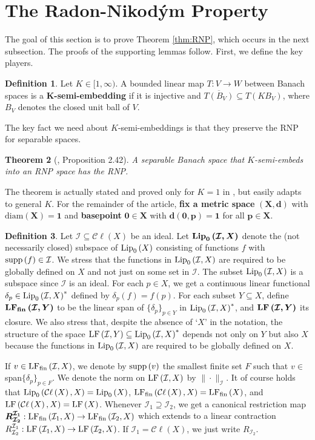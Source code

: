 \documentclass[12pt]{amsart}
\newtheorem{theorem}{Theorem}[section]
\theoremstyle{definition}
\newtheorem{definition}[theorem]{Definition}
\numberwithin{equation}{section}
\def \I {\mathcal{I}}
\def \sbs {\subseteq}
\def \sps {\supseteq}
\def \closure {\overline}
\newcommand{\Cl}[1]{\mathcal{C}\ell\left(#1\right)}
\newcommand{\diam}[1]{\mathrm{diam}\left( #1 \right)}
\begin{document}
\section{The Radon-Nikod\'ym Property} \label{sec:RNP}
The goal of this section is to prove Theorem \ref{thm:RNP}, which occurs in the next subsection. The proofs of the supporting lemmas follow. First, we define the key players.

\begin{definition}
Let $K \in [1,\infty)$. A bounded linear map $T: V \to W$ between Banach spaces is a $\boldsymbol{K}$\textbf{-semi-embedding} if it is injective and $\closure{T(B_V)} \sbs T(KB_V)$, where $B_V$ denotes the closed unit ball of $V$.
\end{definition}

The key fact we need about $K$-semi-embeddings is that they preserve the RNP for separable spaces.

\begin{theorem}[\cite{P}, Proposition 2.42] \label{thm:semiembeddingRNP}
A separable Banach space that $K$-semi-embeds into an RNP space has the RNP.
\end{theorem}

The theorem is actually stated and proved only for $K=1$ in \cite{P}, but easily adapts to general $K$. For the remainder of the article, \textbf{fix a metric space} $\boldsymbol{(X,d)}$ with $\boldsymbol{\diam{X} = 1}$ and \textbf{basepoint} $\boldsymbol{0 \in X}$ with $\boldsymbol{d(0,p) = 1}$ for all $\boldsymbol{p \in X}$.

\begin{definition}
Let $\I \sbs \Cl{X}$ be an ideal. Let $\boldsymbol{\Lip{\I,X}}$ denote the (not necessarily closed) subspace of $\Lip{X}$ consisting of functions $f$ with $\supp{f} \in \I$. We stress that the functions in $\Lip{\I,X}$ are required to be globally defined on $X$ and not just on some set in $\I$. The subset $\Lip{\I,X}$ is a subspace since $\I$ is an ideal. For each $p \in X$, we get a continuous linear functional $\delta_p \in \Lip{\I,X}^*$ defined by $\delta_p(f) = f(p)$. For each subset $Y \sbs X$, define $\boldsymbol{\LFf{\I}{Y}}$ to be the linear span of $\{\delta_p\}_{p \in Y}$ in $\Lip{\I,X}^*$, and $\boldsymbol{\LF{\I}{Y}}$ its closure. We also stress that, despite the absence of `$X$' in the notation, the structure of the space $\LF{\I}{Y} \sbs \Lip{\I,X}^*$ depends not only on $Y$ but also $X$ because the functions in $\Lip{\I,X}$ are required to be globally defined on $X$.

If $v \in \LFf{\I}{X}$, we denote by $\supp{v}$ the smallest finite set $F$ such that $v \in$ span$\{\delta_p\}_{p \in F}$. We denote the norm on $\LF{\I}{X}$ by $\|\cdot\|_\I$. It of course holds that $\Lip{\Cl{X}}{X} = \Lip{X}$, $\LFf{\Cl{X}}{X} = \LFf{X}$, and $\LF{\Cl{X}}{X} = \LF{X}$. Whenever $\I_1 \sps \I_2$, we get a canonical restriction map $\boldsymbol{R^{\I_1}_{\I_2}}: \LFf{\I_1}{X} \to \LFf{\I_2}{X}$ which extends to a linear contraction $R^{\I_1}_{\I_2}: \LF{\I_1}{X} \to \LF{\I_2}{X}$. If $\I_1 = \Cl{X}$, we just write $R_{\I_2}$.
\end{definition}
\end{document}
